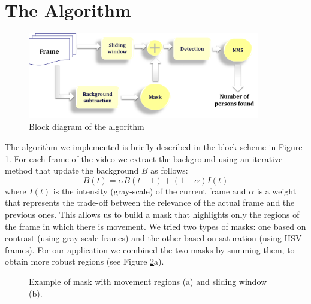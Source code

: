 \documentclass[a4paper, 10pt, onecolumn]{article} %
\begin{document}
\section{The Algorithm}\label{algorithm}
\begin{figure}[h!]
\centering
\includegraphics[width=0.9\textwidth]{schema.png} 
\caption{Block diagram of the algorithm}
\label{fig:diagram}
\end{figure}
\noindent
The algorithm we implemented is briefly described in the block scheme in Figure \ref{fig:diagram}. For each frame of the video we extract the background using an iterative method that update the background $B$ as follows: 
$$B(t) = \alpha B(t-1) + (1-\alpha) I(t)$$
where $I(t)$ is the intensity (gray-scale) of the current frame and $\alpha$ is a weight that represents the trade-off between the relevance of the actual frame and the previous ones.
This allows us to build a mask that highlights only the regions of the frame in which there is movement. We tried two types of masks: one based on contrast (using gray-scale frames) and the other based on saturation (using HSV frames). For our application we combined the two masks by summing them, to obtain more robust regions (see Figure \ref{fig:mask}a). 
\begin{figure}[h!]
\centering
{}
\caption{Example of mask with movement regions (a) and sliding window (b).}
\label{fig:mask}
\end{figure}
\end{document}
